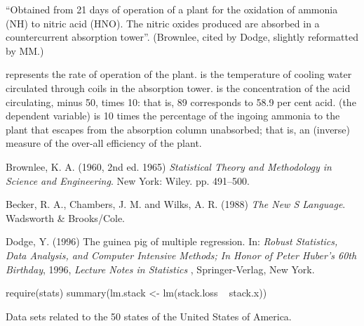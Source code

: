 \begin{Details}\relax
``Obtained from 21 days of operation of a plant for the
oxidation of ammonia (NH) to nitric acid
(HNO).  The nitric oxides produced are absorbed in a
countercurrent absorption tower''.
(Brownlee, cited by Dodge, slightly reformatted by MM.)

 represents the rate of operation of the plant.
 is the temperature of cooling water circulated
through coils in the absorption tower.
 is the concentration of the acid circulating, minus
50, times 10: that is, 89 corresponds to 58.9 per cent acid.
 (the dependent variable) is 10 times the percentage
of the ingoing ammonia to the plant that escapes from the absorption
column unabsorbed; that is, an (inverse) measure of the over-all
efficiency of the plant.
\end{Details}
%
\begin{Source}\relax
Brownlee, K. A. (1960, 2nd ed. 1965)
\emph{Statistical Theory and Methodology in Science and Engineering}.
New York: Wiley. pp. 491--500.
\end{Source}
%
\begin{References}\relax
Becker, R. A., Chambers, J. M. and Wilks, A. R. (1988)
\emph{The New S Language}.
Wadsworth \& Brooks/Cole.

Dodge, Y. (1996)
The guinea pig of multiple regression. In:
\emph{Robust Statistics, Data Analysis, and Computer Intensive
Methods; In Honor of Peter Huber's 60th Birthday}, 1996,
\emph{Lecture Notes in Statistics} , Springer-Verlag, New York.
\end{References}
%
\begin{Examples}
\begin{ExampleCode}
require(stats)
summary(lm.stack <- lm(stack.loss ~ stack.x))
\end{ExampleCode}
\end{Examples}
%
\begin{Description}\relax
Data sets related to the 50 states of the United States of
America.
\end{Description}
